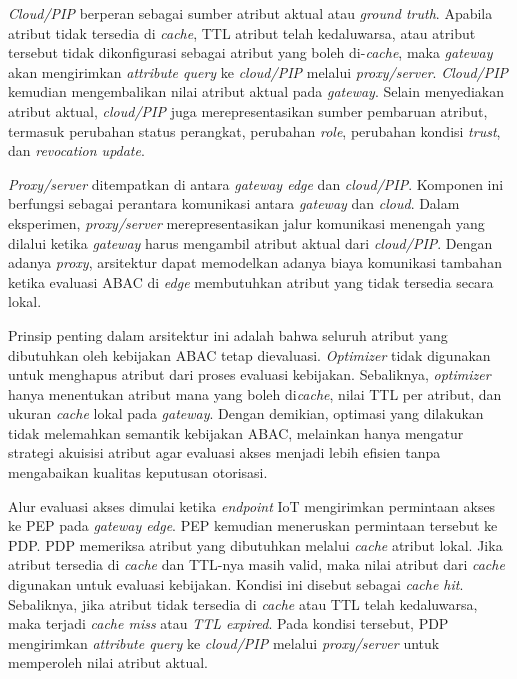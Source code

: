 \textit{Cloud/PIP} berperan sebagai sumber atribut aktual atau \textit{ground truth}. Apabila atribut tidak tersedia di \textit{cache}, TTL atribut telah kedaluwarsa, atau atribut tersebut tidak dikonfigurasi sebagai atribut yang boleh di-\textit{cache}, maka \textit{gateway} akan mengirimkan \textit{attribute query} ke \textit{cloud/PIP} melalui \textit{proxy/server}. \textit{Cloud/PIP} kemudian mengembalikan nilai atribut aktual pada \textit{gateway}. Selain menyediakan atribut aktual, \textit{cloud/PIP} juga merepresentasikan sumber pembaruan atribut, termasuk perubahan status perangkat, perubahan \textit{role}, perubahan kondisi \textit{trust}, dan \textit{revocation update}.

\textit{Proxy/server} ditempatkan di antara \textit{gateway edge} dan \textit{cloud/PIP}. Komponen ini berfungsi sebagai perantara komunikasi antara \textit{gateway} dan \textit{cloud}. Dalam eksperimen, \textit{proxy/server} merepresentasikan jalur komunikasi menengah yang dilalui ketika \textit{gateway} harus mengambil atribut aktual dari \textit{cloud/PIP}. Dengan adanya \textit{proxy}, arsitektur dapat memodelkan adanya biaya komunikasi tambahan ketika evaluasi ABAC di \textit{edge} membutuhkan atribut yang tidak tersedia secara lokal.

Prinsip penting dalam arsitektur ini adalah bahwa seluruh atribut yang dibutuhkan oleh kebijakan ABAC tetap dievaluasi. \textit{Optimizer} tidak digunakan untuk menghapus atribut dari proses evaluasi kebijakan. Sebaliknya, \textit{optimizer} hanya menentukan atribut mana yang boleh di\textit{cache}, nilai TTL per atribut, dan ukuran \textit{cache} lokal pada \textit{gateway}. Dengan demikian, optimasi yang dilakukan tidak melemahkan semantik kebijakan ABAC, melainkan hanya mengatur strategi akuisisi atribut agar evaluasi akses menjadi lebih efisien tanpa mengabaikan kualitas keputusan otorisasi.

Alur evaluasi akses dimulai ketika \textit{endpoint} IoT mengirimkan permintaan akses ke PEP pada \textit{gateway edge}. PEP kemudian meneruskan permintaan tersebut ke PDP. PDP memeriksa atribut yang dibutuhkan melalui \textit{cache} atribut lokal. Jika atribut tersedia di \textit{cache} dan TTL-nya masih valid, maka nilai atribut dari \textit{cache} digunakan untuk evaluasi kebijakan. Kondisi ini disebut sebagai \textit{cache hit}. Sebaliknya, jika atribut tidak tersedia di \textit{cache} atau TTL telah kedaluwarsa, maka terjadi \textit{cache miss} atau \textit{TTL expired}. Pada kondisi tersebut, PDP mengirimkan \textit{attribute query} ke \textit{cloud/PIP} melalui \textit{proxy/server} untuk memperoleh nilai atribut aktual.

